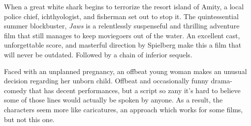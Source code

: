    When a great white shark begins to terrorize the resort island of Amity, a local police chief, ichthyologist, and fisherman set out to stop it. The quintessential summer blockbuster, \textit{Jaws} is a relentlessly suspenseful and thrilling adventure film that still manages to keep moviegoers out of the water. An excellent cast, unforgettable score, and masterful direction by Spielberg make this a film that will never be outdated. Followed by a chain of inferior sequels. \author{DW} 

   Faced with an unplanned pregnancy, an offbeat young woman makes an unusual decision regarding her unborn child. Offbeat and occasionally funny drama-comedy that has decent performances, but a script so zany it's hard to believe some of those lines would actually be spoken by anyone. As a result, the characters seem more like caricatures, an approach which works for some films, but not this one. \author{DW} 
